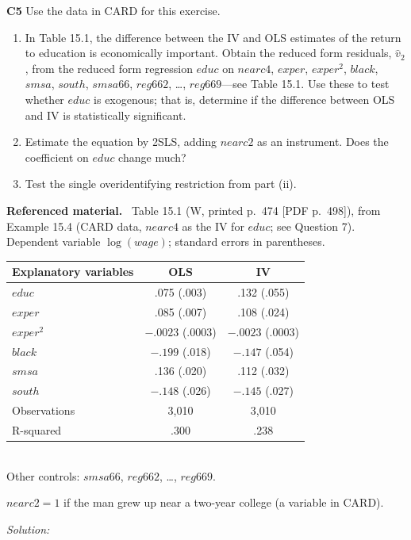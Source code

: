 \documentclass[11pt,a4paper]{article}
\newif\ifsolucoes
\newcommand{\espacoresol}{4.5cm}   %
\newenvironment{refmaterial}{\par\smallskip\noindent\begingroup\small\textbf{Referenced material.}~}{\endgroup\par\smallskip}
\newcommand{\resolespaco}{\ifsolucoes\else\par\textit{Solution:}\vspace{\espacoresol}\par\fi}
\begin{document}
\noindent\textbf{C5} Use the data in CARD for this exercise.
\begin{enumerate}[label=(\roman*)]
\item In Table 15.1, the difference between the IV and OLS estimates of the return to education is
economically important. Obtain the reduced form residuals, $\hat v_2$, from the reduced form regression
$educ$ on $nearc4$, $exper$, $exper^2$, $black$, $smsa$, $south$, $smsa66$, $reg662$, \dots,
$reg669$---see Table 15.1. Use these to test whether $educ$ is exogenous; that is, determine if the
difference between OLS and IV is statistically significant.
\item Estimate the equation by 2SLS, adding $nearc2$ as an instrument. Does the coefficient on $educ$ change much?
\item Test the single overidentifying restriction from part (ii).
\end{enumerate}
\begin{refmaterial}
Table 15.1 (W, printed p.~474 [PDF p.~498]), from Example 15.4 (CARD data, $nearc4$ as the IV for
$educ$; see Question 7). Dependent variable $\log(wage)$; standard errors in parentheses.
\begin{center}\small
\begin{tabular}{lcc}
\toprule
Explanatory variables & OLS & IV\\
\midrule
$educ$ & .075 (.003) & .132 (.055)\\
$exper$ & .085 (.007) & .108 (.024)\\
$exper^2$ & $-.0023$ (.0003) & $-.0023$ (.0003)\\
$black$ & $-.199$ (.018) & $-.147$ (.054)\\
$smsa$ & .136 (.020) & .112 (.032)\\
$south$ & $-.148$ (.026) & $-.145$ (.027)\\
Observations & 3,010 & 3,010\\
R-squared & .300 & .238\\
\bottomrule
\end{tabular}\\[2pt]
Other controls: $smsa66$, $reg662$, \dots, $reg669$.
\end{center}
$nearc2=1$ if the man grew up near a two-year college (a variable in CARD).
\end{refmaterial}
\resolespaco
\end{document}
